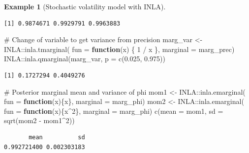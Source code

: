 \documentclass[
  11pt,
  letterpaper,
]{scrbook}
\newenvironment{Shaded}{\begin{snugshade}}{\end{snugshade}}
\newcommand{\AttributeTok}[1]{\textcolor[rgb]{0.40,0.45,0.13}{#1}}
\newcommand{\CommentTok}[1]{\textcolor[rgb]{0.37,0.37,0.37}{#1}}
\newcommand{\ControlFlowTok}[1]{\textcolor[rgb]{0.00,0.23,0.31}{\textbf{#1}}}
\newcommand{\DecValTok}[1]{\textcolor[rgb]{0.68,0.00,0.00}{#1}}
\newcommand{\FloatTok}[1]{\textcolor[rgb]{0.68,0.00,0.00}{#1}}
\newcommand{\FunctionTok}[1]{\textcolor[rgb]{0.28,0.35,0.67}{#1}}
\newcommand{\NormalTok}[1]{\textcolor[rgb]{0.00,0.23,0.31}{#1}}
\newcommand{\OtherTok}[1]{\textcolor[rgb]{0.00,0.23,0.31}{#1}}
\newcommand{\SpecialCharTok}[1]{\textcolor[rgb]{0.37,0.37,0.37}{#1}}
\theoremstyle{plain}
\theoremstyle{plain}
\theoremstyle{definition}
\theoremstyle{definition}
\theoremstyle{definition}
\newtheorem{example}{Example}[chapter]
\theoremstyle{plain}
\theoremstyle{remark}
\begin{document}
\begin{example}[Stochastic volatility model with
INLA]
\begin{verbatim}
[1] 0.9874671 0.9929791 0.9963883
\end{verbatim}

\begin{Shaded}
\begin{Highlighting}[]
\CommentTok{\# Change of variable to get variance from precision}
\NormalTok{marg\_var }\OtherTok{\textless{}{-}}\NormalTok{ INLA}\SpecialCharTok{::}\FunctionTok{inla.tmarginal}\NormalTok{(}
  \AttributeTok{fun =} \ControlFlowTok{function}\NormalTok{(x) \{ }\DecValTok{1} \SpecialCharTok{/}\NormalTok{ x \}, }
  \AttributeTok{marginal =}\NormalTok{ marg\_prec)}
\NormalTok{INLA}\SpecialCharTok{::}\FunctionTok{inla.qmarginal}\NormalTok{(marg\_var, }\AttributeTok{p =} \FunctionTok{c}\NormalTok{(}\FloatTok{0.025}\NormalTok{, }\FloatTok{0.975}\NormalTok{))}
\end{Highlighting}
\end{Shaded}

\begin{verbatim}
[1] 0.1727294 0.4049276
\end{verbatim}

\begin{Shaded}
\begin{Highlighting}[]
\CommentTok{\# Posterior marginal mean and variance of phi}
\NormalTok{mom1 }\OtherTok{\textless{}{-}}\NormalTok{ INLA}\SpecialCharTok{::}\FunctionTok{inla.emarginal}\NormalTok{(}
    \AttributeTok{fun =} \ControlFlowTok{function}\NormalTok{(x)\{x\}, }
    \AttributeTok{marginal =}\NormalTok{ marg\_phi)}
\NormalTok{mom2 }\OtherTok{\textless{}{-}}\NormalTok{ INLA}\SpecialCharTok{::}\FunctionTok{inla.emarginal}\NormalTok{(}
    \AttributeTok{fun =} \ControlFlowTok{function}\NormalTok{(x)\{x}\SpecialCharTok{\^{}}\DecValTok{2}\NormalTok{\}, }
    \AttributeTok{marginal =}\NormalTok{ marg\_phi)}
\FunctionTok{c}\NormalTok{(}\AttributeTok{mean =}\NormalTok{ mom1, }\AttributeTok{sd =} \FunctionTok{sqrt}\NormalTok{(mom2 }\SpecialCharTok{{-}}\NormalTok{ mom1}\SpecialCharTok{\^{}}\DecValTok{2}\NormalTok{))}
\end{Highlighting}
\end{Shaded}

\begin{verbatim}
       mean          sd 
0.992721400 0.002303183 
\end{verbatim}

\end{example}
\end{document}

